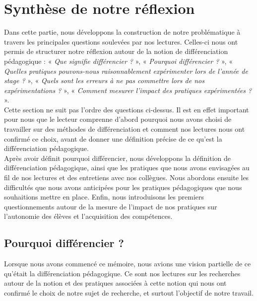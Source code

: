 \section{Synthèse de notre réflexion}
Dans cette partie, nous développons la construction de notre problématique à travers les principales questions soulevées par nos lectures. Celles-ci nous ont permis de structurer notre réflexion autour de la notion de différenciation pédagogique :
« \textit{Que signifie différencier ?} », « \textit{Pourquoi différencier ?} », « \textit{Quelles pratiques pouvons-nous raisonnablement expérimenter lors de l'année de stage ?} », « \textit{Quels sont les erreurs à ne pas commettre lors de nos expérimentations ?} », « \textit{Comment mesurer l'impact des pratiques expérimentées ?} ».\\
Cette section ne suit pas l'ordre des questions ci-dessus. Il est en effet important pour nous que le lecteur comprenne d'abord pourquoi nous avons choisi de travailler sur des méthodes de différenciation et comment nos lectures nous ont confirmé ce choix, avant de donner une définition précise de ce qu'est la différenciation pédagogique.\\
Après avoir définit pourquoi différencier, nous développons la définition de différenciation pédagogique, ainsi que les pratiques que nous avons envisagées au fil de nos lectures et des entretiens avec nos collègues. Nous abordons ensuite les difficultés que nous avons anticipées pour les pratiques pédagogiques que nous souhaitions mettre en place. Enfin, nous introduisons les premiers questionnements autour de la mesure de l'impact de nos pratiques sur l'autonomie des élèves et l'acquisition des compétences.\\

\subsection{Pourquoi différencier ?}

Lorsque nous avons commencé ce mémoire, nous avions une vision partielle de ce qu'était la différenciation pédagogique. Ce sont nos lectures sur les recherches autour de la notion et des pratiques associées à cette notion qui nous ont confirmé le choix de notre sujet de recherche, et surtout l'objectif de notre travail.
